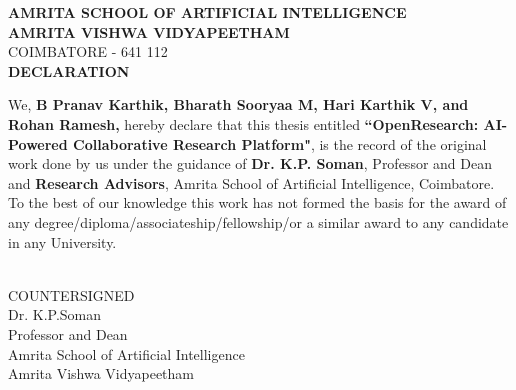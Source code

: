 \documentclass[12pt]{report}
\begin{document}
\newpage
\baselineskip 1cm
\thispagestyle{empty}

\begin{center}
    \large {\textbf{AMRITA SCHOOL OF ARTIFICIAL INTELLIGENCE}}\\
    \vspace*{.2cm}
    \Large{ \textbf{ AMRITA VISHWA VIDYAPEETHAM}}\\
    \vspace*{.2cm}
    \small{ COIMBATORE} - 641 112\\
    \vspace*{.6cm}
    \large {\textbf{DECLARATION}}
    \vspace*{.1cm}
\end{center}

We, \textbf{B Pranav Karthik, Bharath Sooryaa M, Hari Karthik V, and Rohan Ramesh,} hereby declare that this thesis entitled {\sc \textbf{``OpenResearch: AI-Powered Collaborative Research Platform"}}, is the record of the original work done by us under the guidance of \textbf{Dr. K.P. Soman}, Professor and Dean and  \textbf{Research Advisors}, Amrita School of Artificial Intelligence, Coimbatore. To the best of our knowledge this work has not formed the basis for the award of any degree/diploma/associateship/fellowship/or a similar award to any candidate in any University.\\

\vspace*{.2cm}
 \\

\vspace*{.2cm}
\begin{center}
    \large {COUNTERSIGNED}\\
    \vspace*{1.7cm}
    \small {Dr. K.P.Soman\\
        \vspace*{.1cm}
        Professor and Dean\\
        \vspace*{.1cm}
        Amrita School of Artificial Intelligence\\
        \vspace*{.1cm}
        Amrita Vishwa Vidyapeetham}
\end{center}
\end{document}
